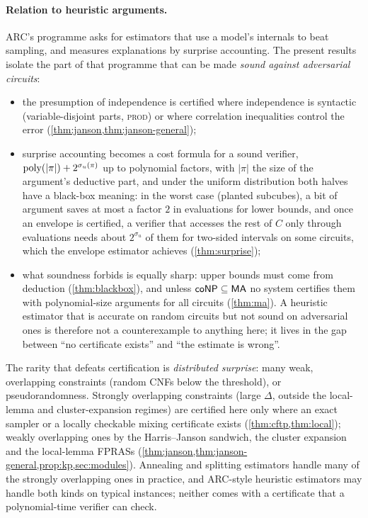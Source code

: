 \paragraph{Relation to heuristic arguments.}
ARC's programme \cite{christiano2022presumption,hilton2024surprise} asks for
estimators that use a model's internals to beat sampling, and measures
explanations by surprise accounting. The present results isolate the part of
that programme that can be made \emph{sound against adversarial circuits}:
\begin{itemize}
\item the presumption of independence is certified where independence is
syntactic (variable-disjoint parts, \textsc{prod}) or where correlation
inequalities control the error (\cref{thm:janson,thm:janson-general});
\item surprise accounting becomes a cost formula for a sound verifier,
$\mathrm{poly}(|\pi|)+2^{\sigma_u(\pi)}$ up to polynomial factors, with $|\pi|$ the size of
the argument's deductive part, and under the uniform distribution both halves have a
black-box meaning: in the worst case (planted subcubes), a bit of argument saves at
most a factor $2$ in evaluations for lower bounds, and once an envelope is certified, a verifier that accesses the rest of $C$ only through
evaluations needs about $2^{\sigma_u}$ of them for two-sided intervals on some
circuits, which the envelope estimator achieves (\cref{thm:surprise});
\item what soundness forbids is equally sharp: upper bounds must come from
deduction (\cref{thm:blackbox}), and unless $\mathsf{coNP}\subseteq\mathsf{MA}$ no system certifies
them with polynomial-size arguments for all circuits (\cref{thm:ma}). A heuristic estimator that is accurate on random circuits but
not sound on adversarial ones is therefore not a counterexample to anything
here; it lives in the gap between ``no certificate exists'' and ``the estimate
is wrong''.
\end{itemize}
The rarity that defeats certification is \emph{distributed surprise}: many
weak, overlapping constraints (random CNFs below the threshold), or
pseudorandomness. Strongly overlapping constraints (large $\Delta$, outside the
local-lemma and cluster-expansion regimes) are certified here only where an exact
sampler or a locally checkable mixing certificate exists (\cref{thm:cftp,thm:local});
weakly overlapping ones by the Harris--Janson sandwich, the cluster expansion and the
local-lemma FPRASs (\cref{thm:janson,thm:janson-general,prop:kp,sec:modules}).
Annealing and splitting estimators handle many of the strongly overlapping ones in practice, and ARC-style
heuristic estimators may handle both kinds on typical instances; neither comes with a
certificate that a polynomial-time verifier can check.

